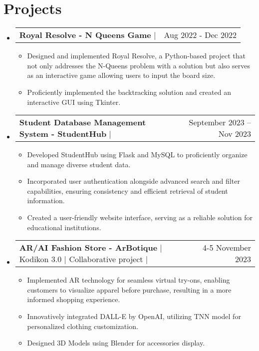 \documentclass[letterpaper,11pt]{article}
\makeatletter
\newcommand{\resumeItem}[1]{
  \item\small{
    {#1 \vspace{-2pt}}
  }
}
\newcommand{\resumeProjectHeading}[2]{
    \item
    \begin{tabular*}{0.97\textwidth}{l@{\extracolsep{\fill}}r}
      \small#1 & #2 \\
    \end{tabular*}\vspace{-7pt}
}
\newcommand{\resumeSubHeadingListStart}{\begin{itemize}[leftmargin=0.15in, label={}]}
\newcommand{\resumeSubHeadingListEnd}{\end{itemize}}
\newcommand{\resumeItemListStart}{\begin{itemize}}
\newcommand{\resumeItemListEnd}{\end{itemize}\vspace{-5pt}}
\makeatother
\begin{document}
\section{Projects}
    \resumeSubHeadingListStart

        \resumeProjectHeading
        {\textbf{Royal Resolve - N Queens Game} $|$ 
        \href{https://github.com/urvashii-b/RoyalResolve-NQueens}{\color{blue}\faIcon{github}}}{Aug 2022 - Dec 2022}
        \resumeItemListStart
            \resumeItem{Designed and implemented Royal Resolve, a Python-based project that not only addresses the N-Queens problem with a solution but also serves as an interactive game allowing users to input the board size.}
            \resumeItem{Proficiently implemented the backtracking solution and created an interactive GUI using Tkinter.}   
        \resumeItemListEnd
        
        \resumeProjectHeading
        {\textbf{Student Database Management System - StudentHub} $|$ \href{https://github.com/urvashii-b/StudentHub}{\color{blue}\faIcon{github}} }{September 2023 -- Nov 2023}
        \resumeItemListStart
            \resumeItem{Developed StudentHub using Flask and MySQL to proficiently organize and manage diverse student data.}
            \resumeItem{Incorporated user authentication alongside advanced search and filter capabilities, ensuring consistency and efficient retrieval of student information.}
            \resumeItem{Created a user-friendly website interface, serving as a reliable solution for educational institutions.}
        \resumeItemListEnd
        
        \resumeProjectHeading
        {\textbf{AR/AI Fashion Store - ArBotique} $|$ {Kodikon 3.0} $|$ {Collaborative project} $|$ \href{https://github.com/urvashii-b/11_ArBotique}{\color{blue}\faIcon{github}}}
        {4-5 November 2023}
        \resumeItemListStart
            \resumeItem{Implemented AR technology for seamless virtual try-ons, enabling customers to visualize apparel before purchase, resulting in a more informed shopping experience.}
            \resumeItem{Innovatively integrated DALL-E by OpenAI, utilizing TNN model for personalized clothing customization.}
            \resumeItem{Designed 3D Models using Blender for accessories display.}
        \resumeItemListEnd

        \begin{comment}
        /*\resumeProjectHeading
        {\textbf{Student Portal - CodeCampus} $|$ \href{https://github.com/urvashii-b/decode}{\faIcon{github}}}{6th September 2023 - Present}
        \resumeItemListStart
            \resumeItem{Executed the 'CodeCampus' project, revolutionizing the digital learning experience for our university.}
            \resumeItem{The platform streamlined assignment submission and grading processes, resulting in 20 \% improvement in student satisfaction.} 
            \resumeItem{Enhanced the project by introducing advanced features like plagiarism detection and role-based login providing security features.} 
        \resumeItemListEnd
        \end{comment}
    \resumeSubHeadingListEnd
\end{document}
